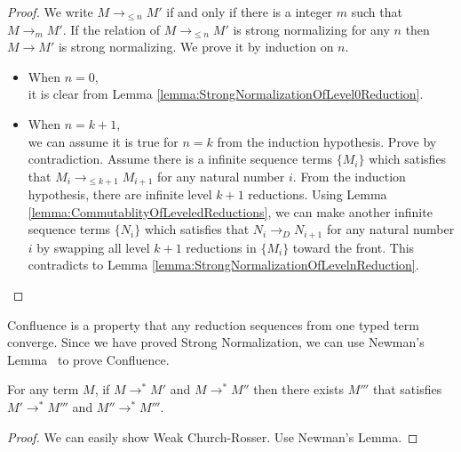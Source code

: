 \begin{proof}
    We write \( M \longrightarrow_{\le n} M' \) if and only if there is a integer \( m \) such that \( M \longrightarrow_m M' \).
    If the relation of \( M \longrightarrow_{\le n} M' \) is strong normalizing for any \( n \) then \( M \longrightarrow M' \) is strong normalizing.
    We prove it by induction on \( n \).
    \begin{itemize}
        \item When \( n = 0 \), \\
            it is clear from Lemma \ref{lemma:StrongNormalizationOfLevel0Reduction}.
        \item When \( n = k + 1 \), \\
            we can assume it is true for \( n = k \) from the induction
            hypothesis. Prove by contradiction. Assume there is a infinite
            sequence terms $\{M_i\}$ which satisfies that $M_i
            \longrightarrow_{\le k+1} M_{i+1}$ for any natural number \( i \).
            From the induction hypothesis, there are infinite level \( k + 1 \)
            reductions. Using Lemma
            \ref{lemma:CommutablityOfLeveledReductions}, we can make another
            infinite sequence terms $\{N_i\}$ which satisfies that $N_i
            \longrightarrow_D N_{i+1}$ for any natural number \( i \) by
            swapping all level \( k + 1 \) reductions in \( \{ M_i \} \) toward
            the front. This contradicts to Lemma
            \ref{lemma:StrongNormalizationOfLevelnReduction}.
    \end{itemize}
\end{proof}

Confluence is a property that any reduction sequences from one typed term
converge.  Since we have proved Strong Normalization, we can use Newman's
Lemma~\cite{DBLP:books/daglib/0092409} to prove Confluence.

\begin{theorem}[Confluence]
    \label{theorem:confluence}
	For any term $M$, if $M \longrightarrow^* M'$ and $M \longrightarrow^* M''$ then
	there exists $M'''$ that satisfies $M' \longrightarrow^* M'''$ and $M'' \longrightarrow^* M'''$.
\end{theorem}

\begin{proof}
  We can easily show Weak Church-Rosser. Use Newman's Lemma.
\end{proof}

